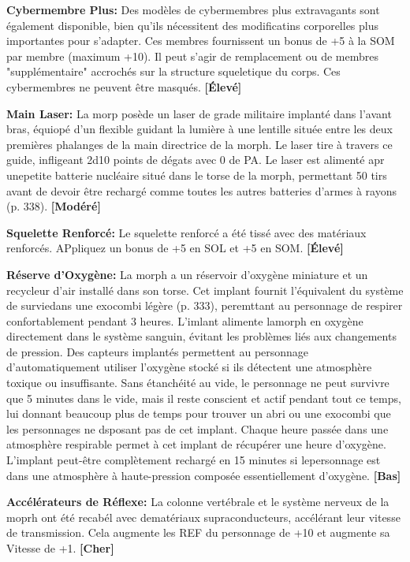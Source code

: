 {{\textbf{Cybermembre Plus:} Des modèles de cybermembres plus extravagants sont également disponible, bien qu'ils nécessitent des modificatins corporelles plus importantes pour s'adapter. Ces membres fournissent un bonus de +5 à la SOM par membre (maximum +10). Il peut s'agir de remplacement ou de membres "supplémentaire" accrochés sur la structure squeletique du corps. Ces cybermembres ne peuvent être masqués. \textbf{[Élevé]} 

\textbf{Main Laser:} La morp posède un laser de grade militaire implanté dans l'avant bras, équiopé d'un flexible guidant la lumière à une lentille située entre les deux premières phalanges de la main directrice de la morph. Le laser tire à travers ce guide, infligeant 2d10 points de dégats avec 0 de PA. Le laser est alimenté apr unepetite batterie nucléaire situé dans le torse de la morph, permettant 50 tirs avant de devoir être rechargé comme toutes les autres batteries d'armes à rayons (p. 338). \textbf{[Modéré]} 

\textbf{Squelette Renforcé:} Le squelette renforcé a été tissé avec des matériaux renforcés. APpliquez un bonus de +5 en SOL et +5 en SOM. \textbf{[Élevé]} 

\textbf{Réserve d'Oxygène:} La morph a un réservoir d'oxygène miniature et un recycleur d'air installé dans son torse. Cet implant fournit l'équivalent du système de surviedans une exocombi légère (p. 333), peremttant au personnage de respirer confortablement pendant 3 heures. L'imlant alimente lamorph en oxygène directement dans le système sanguin, évitant les problèmes liés aux changements de pression. Des capteurs implantés permettent au personnage d'automatiquement utiliser l'oxygène stocké si ils détectent une atmosphère toxique ou insuffisante. Sans étanchéité au vide, le personnage ne peut survivre que 5 minutes dans le vide, mais il reste conscient et actif pendant tout ce temps, lui donnant beaucoup plus de temps pour trouver un abri ou une exocombi que les personnages ne dsposant pas de cet implant. Chaque heure passée dans une atmosphère respirable permet à cet implant de récupérer une heure d'oxygène. L'implant peut-être complètement rechargé en 15 minutes si lepersonnage est dans une atmosphère à haute-pression composée essentiellement d'oxygène. \textbf{[Bas]} 

\textbf{Accélérateurs de Réflexe:} La colonne vertébrale et le système nerveux de la moprh ont été recabél avec dematériaux supraconducteurs, accélérant leur vitesse de transmission. Cela augmente les REF du personnage de +10 et augmente sa Vitesse de +1. \textbf{[Cher]} 

}}
